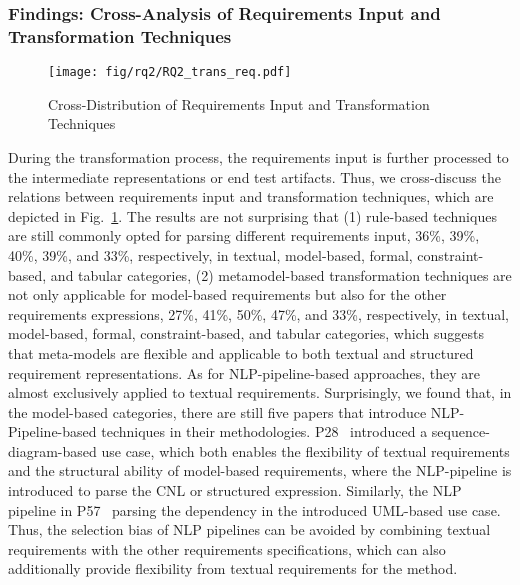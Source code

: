 \subsubsection{Findings: Cross-Analysis of Requirements Input and Transformation Techniques}
\begin{figure}
    \centering
    \texttt{[image: fig/rq2/RQ2\_trans\_req.pdf]}
    \caption{Cross-Distribution of Requirements Input and Transformation Techniques}
    \label{fig:trans_req}
\end{figure}

During the transformation process, the requirements input is further processed to the intermediate representations or end test artifacts. Thus, we cross-discuss the relations between requirements input and transformation techniques, which are depicted in Fig.~\ref{fig:trans_req}. The results are not surprising that (1) rule-based techniques are still commonly opted for parsing different requirements input, 36\%, 39\%, 40\%, 39\%, and 33\%, respectively, in textual, model-based, formal, constraint-based, and tabular categories, (2) metamodel-based transformation techniques are not only applicable for model-based requirements but also for the other requirements expressions, 27\%, 41\%, 50\%, 47\%, and 33\%, respectively, in textual, model-based, formal, constraint-based, and tabular categories, which suggests that meta-models are flexible and applicable to both textual and structured requirement representations. As for NLP-pipeline-based approaches, they are almost exclusively applied to textual requirements. Surprisingly, we found that, in the model-based categories, there are still five papers that introduce NLP-Pipeline-based techniques in their methodologies. P28~ introduced a sequence-diagram-based use case, which both enables the flexibility of textual requirements and the structural ability of model-based requirements, where the NLP-pipeline is introduced to parse the CNL or structured expression. Similarly, the NLP pipeline in P57~ parsing the dependency in the introduced UML-based use case. Thus, the selection bias of NLP pipelines can be avoided by combining textual requirements with the other requirements specifications, which can also additionally provide flexibility from textual requirements for the method.

